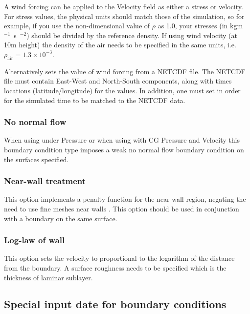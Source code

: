A wind forcing can be applied to the Velocity field as either a stress or
velocity. For stress values, the physical units should match those of the
simulation, so for example, if you use the non-dimensional value of $\rho$
as 1.0, your stresses (in \unit{kgm\ensuremath{^{-1}}s\ensuremath{^{-2}}})
should be divided by the reference density.  If using wind velocity
(at 10m height) the density of the air needs to be specified in the same
units, i.e. $\rho_{\textrm{air}} = 1.3\times10^{-3}$.

Alternatively
sets the value of wind forcing from a NETCDF file. The NETCDF file must
contain East-West and North-South components, along with times locations
(latitude/longitude) for the values. In addition, one must set
 in order for the simulated
time to be matched to the NETCDF data.

\subsubsection{No normal flow}

When using  under Pressure  or when using 
 with CG Pressure and Velocity this boundary condition type 
imposes a weak no normal flow boundary condition on the surfaces specified.

\subsubsection{Near-wall treatment}

This option implements a penalty function for the near wall region, negating the need to use fine meshes
near walls \citep{bazilevs2007}. This option should be used in conjunction with a 
 boundary on the same surface.

\subsubsection{Log-law of wall}

This option sets the velocity to proportional to the logarithm of the distance from the boundary. 
A surface roughness needs to be specified which is the thickness of laminar sublayer.

\subsection{Special input date for boundary conditions}\label{sec:BCs:specialised}

